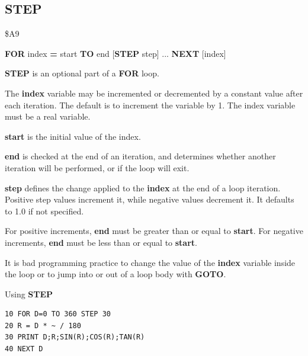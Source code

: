 
\newpage
\subsection{STEP}
\begin{description}[leftmargin=2cm,style=nextline]
\item [Token:]    \$A9

\item [Format:]   {\bf FOR} index {\bf =} start {\bf TO} end [{\bf STEP} step] ... {\bf NEXT} [index]

\item [Usage:]    {\bf STEP} is an optional part of a {\bf FOR} loop.

                  The {\bf index} variable may be incremented or decremented by a constant value after each iteration. The default is to increment the variable by 1. The index variable must be a real variable.

                  {\bf start} is the initial value of the index.

                  {\bf end} is checked at the end of an iteration, and determines whether another iteration will be performed, or if the loop will exit.

                  {\bf step} defines the change applied to the {\bf index} at the end of a loop iteration. Positive step values increment it, while negative values decrement it. It defaults to 1.0 if not specified.

\item [Remarks:]  For positive increments, {\bf end} must be greater than or equal to {\bf start}. For negative increments, {\bf end} must be less than or equal to {\bf start}.

                  It is bad programming practice to change the value of the {\bf index} variable inside the loop or to jump into or out of a loop body with {\bf GOTO}.

\item [Example:]  Using {\bf STEP}

\begin{tcolorbox}[colback=black,coltext=white]
\verbatimfont{\codefont}
\begin{verbatim}
10 FOR D=0 TO 360 STEP 30
20 R = D * ~ / 180
30 PRINT D;R;SIN(R);COS(R);TAN(R)
40 NEXT D
\end{verbatim}
\end{tcolorbox}
\end{description}

